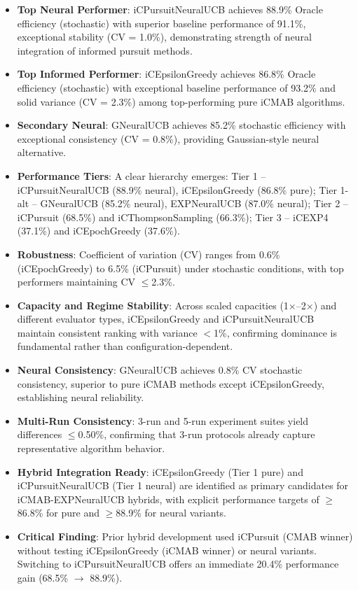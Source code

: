 \documentclass[12pt,a4paper]{article}
\newcommand{\primarytext}[1]{\textcolor{primaryblue}{\textbf{#1}}}
\newcommand{\secondarytext}[1]{\textcolor{secondaryblue}{\textbf{#1}}}
\newcommand{\success}[1]{\textcolor{accentgreen}{\textbf{#1}}}
\newcommand{\warning}[1]{\textcolor{warningred}{\textbf{#1}}}
\newcommand{\neural}[1]{\textcolor{neuralcolor}{\textbf{#1}}}
\begin{document}
\begin{tcolorbox}[colback=highlightgray,colframe=primaryblue,title=\textbf{Executive Summary}]
\begin{itemize}
\item \neural{Top Neural Performer}: iCPursuitNeuralUCB achieves 88.9\% Oracle efficiency (stochastic) with superior baseline performance of 91.1\%, exceptional stability (CV = 1.0\%), demonstrating strength of neural integration of informed pursuit methods.
\item \primarytext{Top Informed Performer}: iCEpsilonGreedy achieves 86.8\% Oracle efficiency (stochastic) with exceptional baseline performance of 93.2\% and solid variance (CV = 2.3\%) among top-performing pure iCMAB algorithms.
\item \neural{Secondary Neural}: GNeuralUCB achieves 85.2\% stochastic efficiency with exceptional consistency (CV = 0.8\%), providing Gaussian-style neural alternative.
\item \secondarytext{Performance Tiers}: A clear hierarchy emerges: Tier 1 -- iCPursuitNeuralUCB (88.9\% neural), iCEpsilonGreedy (86.8\% pure); Tier 1-alt -- GNeuralUCB (85.2\% neural), EXPNeuralUCB (87.0\% neural); Tier 2 -- iCPursuit (68.5\%) and iCThompsonSampling (66.3\%); Tier 3 -- iCEXP4 (37.1\%) and iCEpochGreedy (37.6\%).
\item \success{Robustness}: Coefficient of variation (CV) ranges from 0.6\% (iCEpochGreedy) to 6.5\% (iCPursuit) under stochastic conditions, with top performers maintaining CV $\leq$2.3\%.
\item \success{Capacity and Regime Stability}: Across scaled capacities (1$\times$--2$\times$) and different evaluator types, iCEpsilonGreedy and iCPursuitNeuralUCB maintain consistent ranking with variance $<$1\%, confirming dominance is fundamental rather than configuration-dependent.
\item \neural{Neural Consistency}: GNeuralUCB achieves 0.8\% CV stochastic consistency, superior to pure iCMAB methods except iCEpsilonGreedy, establishing neural reliability.
\item \success{Multi-Run Consistency}: 3-run and 5-run experiment suites yield differences $\leq$0.50\%, confirming that 3-run protocols already capture representative algorithm behavior.
\item \primarytext{Hybrid Integration Ready}: iCEpsilonGreedy (Tier 1 pure) and iCPursuitNeuralUCB (Tier 1 neural) are identified as primary candidates for iCMAB-EXPNeuralUCB hybrids, with explicit performance targets of $\geq$86.8\% for pure and $\geq$88.9\% for neural variants.
\item \warning{Critical Finding}: Prior hybrid development used iCPursuit (CMAB winner) without testing iCEpsilonGreedy (iCMAB winner) or neural variants. Switching to iCPursuitNeuralUCB offers an immediate 20.4\% performance gain (68.5\% $\rightarrow$ 88.9\%).
\end{itemize}
\end{tcolorbox}
\end{document}
